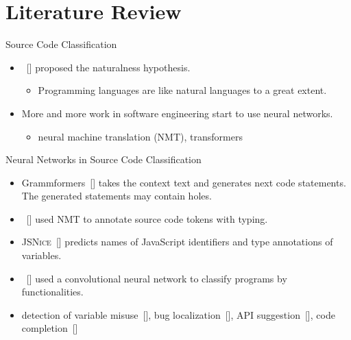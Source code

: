 \documentclass[xcolor=svgnames]{beamer}
\begin{document}
\section{Literature Review}
\begin{frame}{Source Code Classification}

\begin{itemize}
\item {}~[] proposed the naturalness hypothesis.
\begin{itemize}
\item Programming languages are like natural languages to a great extent.
\end{itemize}

\item  More and more work in software engineering start to use neural networks.
\begin{itemize}
\item neural machine translation (NMT), transformers
\end{itemize}
\end{itemize}
\end{frame}

\begin{frame}{Neural Networks in Source Code Classification}


\begin{itemize}
\item  Grammformers~[] takes the context text and generates next code statements. The generated statements may contain holes.

\item {}~[] used NMT to annotate source code tokens with typing.

\item \textsc{JSNice}~[] predicts names of JavaScript identifiers and type annotations of variables.

\item {}~[] used a convolutional neural network to classify programs by functionalities.

\item detection of variable misuse~[],
bug localization~[],
API suggestion~[],
code completion~[]
\end{itemize}
\end{frame}
\end{document}
